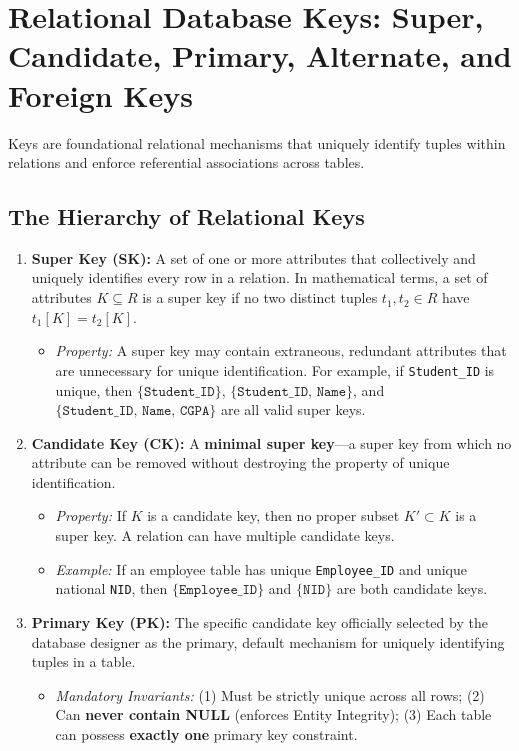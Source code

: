 \newpage
\section{Relational Database Keys: Super, Candidate, Primary, Alternate, and Foreign Keys}

Keys are foundational relational mechanisms that uniquely identify tuples within relations and enforce referential associations across tables.

\subsection{The Hierarchy of Relational Keys}

\begin{enumerate}
\item \textbf{Super Key (SK):}
A set of one or more attributes that collectively and uniquely identifies every row in a relation. In mathematical terms, a set of attributes $K \subseteq R$ is a super key if no two distinct tuples $t_1, t_2 \in R$ have $t_1[K] = t_2[K]$.
\begin{itemize}
\item \textit{Property:} A super key may contain extraneous, redundant attributes that are unnecessary for unique identification. For example, if \texttt{Student\_ID} is unique, then $\{\texttt{Student\_ID}\}$, $\{\texttt{Student\_ID, Name}\}$, and $\{\texttt{Student\_ID, Name, CGPA}\}$ are all valid super keys.
\end{itemize}

\item \textbf{Candidate Key (CK):}
A \textbf{minimal super key}—a super key from which no attribute can be removed without destroying the property of unique identification.
\begin{itemize}
\item \textit{Property:} If $K$ is a candidate key, then no proper subset $K' \subset K$ is a super key. A relation can have multiple candidate keys.
\item \textit{Example:} If an employee table has unique \texttt{Employee\_ID} and unique national \texttt{NID}, then $\{\texttt{Employee\_ID}\}$ and $\{\texttt{NID}\}$ are both candidate keys.
\end{itemize}

\item \textbf{Primary Key (PK):}
The specific candidate key officially selected by the database designer as the primary, default mechanism for uniquely identifying tuples in a table.
\begin{itemize}
\item \textit{Mandatory Invariants:} (1) Must be strictly unique across all rows; (2) Can \textbf{never contain NULL} (enforces Entity Integrity); (3) Each table can possess \textbf{exactly one} primary key constraint.
\end{itemize}


\end{enumerate}
